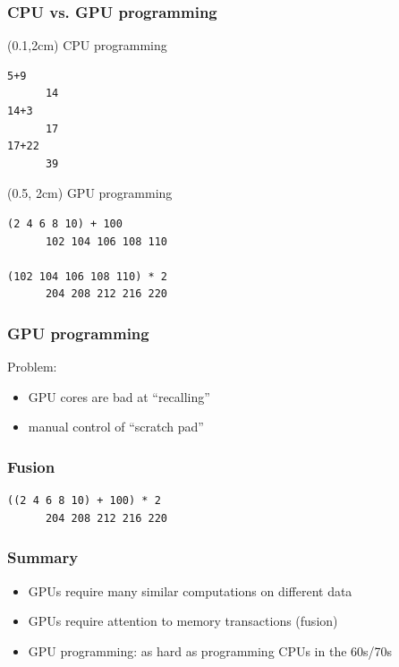 \documentclass{beamer}
\begin{document}
\begin{frame}[fragile]
\frametitle{CPU vs. GPU programming}

\begin{textblock*}{0.6\textwidth}(0.1\textwidth,2cm)
CPU programming
\begin{verbatim}
5+9
      14
14+3
      17
17+22
      39
\end{verbatim}
\end{textblock*}

\begin{textblock*}{0.7\textwidth}(0.5\textwidth, 2cm)
GPU programming
\begin{verbatim}
(2 4 6 8 10) + 100
      102 104 106 108 110

(102 104 106 108 110) * 2
      204 208 212 216 220
\end{verbatim}
\end{textblock*}
\end{frame}

\begin{frame}[fragile]
\frametitle{GPU programming}

Problem:
\begin{itemize}
\item GPU cores are bad at ``recalling''
\item manual control of ``scratch pad''
\end{itemize}

\end{frame}

\begin{frame}[fragile]
\frametitle{Fusion}

\begin{verbatim}
((2 4 6 8 10) + 100) * 2
      204 208 212 216 220
\end{verbatim}
\end{frame}

\begin{frame}
\frametitle{Summary}
\begin{itemize}
\item GPUs require many similar computations on different data
\item GPUs require attention to memory transactions (fusion)
\item GPU programming: as hard as programming CPUs in the 60s/70s
\end{itemize}
\end{frame}
\end{document}
